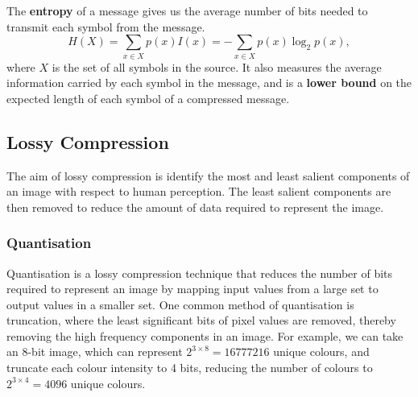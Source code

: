 \documentclass{article}
\begin{document}
\begin{definition}[Entropy]
    The \textbf{entropy} of a message gives us the average number of
    bits needed to transmit each symbol from the message.
    \begin{equation*}
        H\left( X \right) = \sum_{x \in X} p\left( x \right) I\left( x \right) = -\sum_{x \in X} p\left( x \right) \log_2{p\left( x \right)},
    \end{equation*}
    where \(X\) is the set of all symbols in the source. It also
    measures the average information carried by each symbol in the
    message, and is a \textbf{lower bound} on the expected length of
    each symbol of a compressed message.
\end{definition}
\subsection{Lossy Compression}
The aim of lossy compression is identify the most and least salient
components of an image with respect to human perception. The least
salient components are then removed to reduce the amount of data
required to represent the image.
\subsubsection{Quantisation}
Quantisation is a lossy compression technique that reduces the number
of bits required to represent an image by mapping input values from a
large set to output values in a smaller set. One common method of
quantisation is truncation, where the least significant bits of pixel
values are removed, thereby removing the high frequency components in
an image. For example, we can take an 8-bit image, which can represent
\(2^{3 \times 8} = \num{16 777 216}\) unique colours, and truncate each
colour intensity to 4 bits, reducing the number of colours to \(2^{3
\times 4} = 4096\) unique colours.
\end{document}
